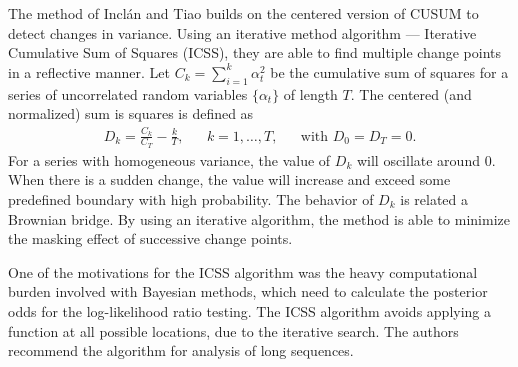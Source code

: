 The method of Incl\'{a}n and Tiao \cite{inclan1994use} builds on the centered version of CUSUM to detect changes in variance.
Using an iterative method algorithm --- Iterative Cumulative Sum of Squares (ICSS), they are able to find multiple change points in a reflective manner.
Let $C_k = \sum_{i=1}^k \alpha_t^2$ be the cumulative sum of squares for a series of uncorrelated random variables $\{\alpha_t\}$ of length $T$.
The centered (and normalized) sum is squares is defined as
\begin{equation}
  \begin{aligned}
  D_k = \frac{C_k}{C_T} - \frac{k}{T}, & & k = 1, \dots, T, & & \text{with } D_0 = D_T = 0.
  \end{aligned}
\end{equation}
For a series with homogeneous variance, the value of $D_k$ will oscillate around $0$.
When there is a sudden change, the value will increase and exceed some predefined boundary with high probability.
The behavior of $D_k$ is related a Brownian bridge.
By using an iterative algorithm, the method is able to minimize the masking effect of successive change points.

One of the motivations for the ICSS algorithm was the heavy computational burden involved with Bayesian methods, which need to calculate the posterior odds for the log-likelihood ratio testing.
The ICSS algorithm avoids applying a function at all possible locations, due to the iterative search.
The authors recommend the algorithm for analysis of long sequences.
